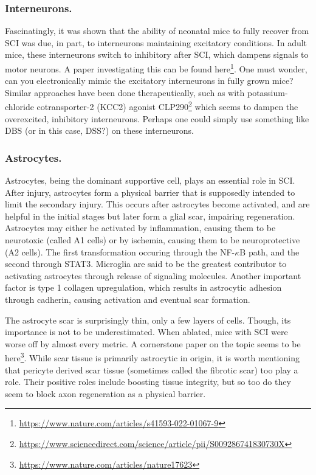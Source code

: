 \documentclass[12pt]{report}
\begin{document}
\subsubsection{Interneurons.}
Fascinatingly, it was shown that the ability of neonatal mice to fully recover from SCI was due, in part, to interneurons maintaining excitatory conditions. In adult mice, these interneurons switch to inhibitory after SCI, which dampens signals to motor neurons. A paper investigating this can be found here\footnote{\url{https://www.nature.com/articles/s41593-022-01067-9}}. One must wonder, can you electronically mimic the excitatory interneurons in fully grown mice? Similar approaches have been done therapeutically, such as with potassium-chloride cotransporter-2 (KCC2) agonist CLP290\footnote{\url{https://www.sciencedirect.com/science/article/pii/S009286741830730X}} which seems to dampen the overexcited, inhibitory interneurons. Perhaps one could simply use something like DBS (or in this case, DSS?) on these interneurons.  

\subsubsection{Astrocytes.}
Astrocytes, being the dominant supportive cell, plays an essential role in SCI. After injury, astrocytes form a physical barrier that is supposedly intended to limit the secondary injury. This occurs after astrocytes become activated, and are helpful in the initial stages but later form a glial scar, impairing regeneration. Astrocytes may either be activated by inflammation, causing them to be neurotoxic (called A1 cells) or by ischemia, causing them to be neuroprotective (A2 cells). The first transformation occuring through the NF-$\kappa$B path, and the second through STAT3. Microglia are said to be the greatest contributor to activating astrocytes through release of signaling molecules. Another important factor is type 1 collagen upregulation, which results in astrocytic adhesion through cadherin, causing activation and eventual scar formation.\newline

The astrocyte scar is surprisingly thin, only a few layers of cells. Though, its importance is not to be underestimated. When ablated, mice with SCI were worse off by almost every metric. A cornerstone paper on the topic seems to be here\footnote{\url{https://www.nature.com/articles/nature17623}}. While scar tissue is primarily astrocytic in origin, it is worth mentioning that pericyte derived scar tissue (sometimes called the fibrotic scar) too play a role. Their positive roles include boosting tissue integrity, but so too do they seem to block axon regeneration as a physical barrier. 
\end{document}
